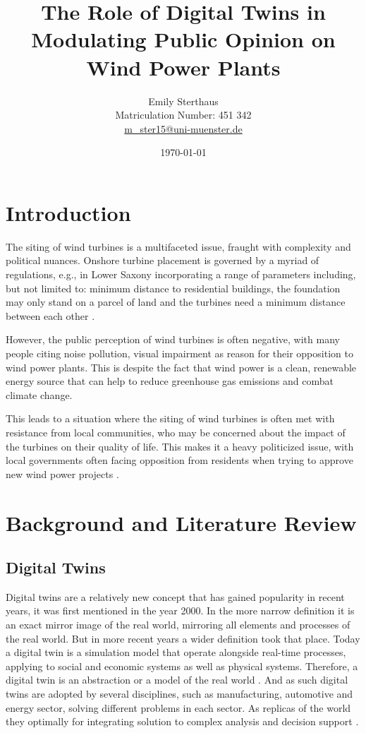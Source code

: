\documentclass[11pt, titlepage, a4paper]{scrartcl}
\title{The Role of Digital Twins in Modulating Public Opinion on Wind Power Plants}
\author{Emily Sterthaus \\ Matriculation Number: 451 342 \\ \href{mailto:m_ster15@uni-muenster.de}{m\_ster15@uni-muenster.de}}
\affil{Institute of Geoinformatics, University of Münster}
\date{\today}
\begin{document}
\maketitle


\newpage
\tableofcontents
\newpage
\begin{linenumbers}
    \section{Introduction}
    The siting of wind turbines is a multifaceted issue, fraught with complexity and political nuances. Onshore
    turbine placement is governed by a myriad of regulations, e.g., in Lower Saxony incorporating a range of parameters including, but not
    limited to: minimum distance to residential buildings, the foundation may only stand on a parcel of land and the
    turbines need a minimum distance between each other
    \cite{niedersachsischesministeriumfurumweltenergieundklimaschutzPlanungUndGenehmigung2021}.

    However, the public perception of wind turbines is often negative, with many people citing noise pollution, visual impairment as reason for their opposition to wind power plants. This is despite the fact that wind power is a clean, renewable energy source that can help to reduce greenhouse gas emissions and combat climate change.

    This leads to a situation where the siting of wind turbines is often met with resistance from local communities, who may be concerned about the impact of the turbines on their quality of life. This makes it a heavy politicized issue, with local governments often facing opposition from residents when trying to approve new wind power projects \cite{kwasniewskiWindenergieVerhindertAntiWindkraftBewegung2021}.

    \section{Background and Literature Review}
    \subsection{Digital Twins}
    Digital twins are a relatively new concept that has gained popularity in recent years, it was first  mentioned in the year 2000. In the more narrow definition it is an exact mirror image of the real world, mirroring all elements and processes of the real world. But in more recent years a wider definition took that place. Today a digital twin is a simulation model that operate alongside real-time processes, applying to social and economic systems as well as physical systems. Therefore, a digital twin is an abstraction or a model of the real world \cite{battyDigitalTwins2018}.
    And as such digital twins are adopted by several disciplines, such as manufacturing, automotive and energy sector, solving different problems in each sector. As replicas of the world they optimally for integrating solution to complex analysis and decision support \cite{pylianidisIntroducingDigitalTwins2021}.

\end{linenumbers}
\end{document}
